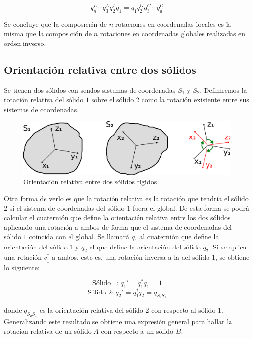 \documentclass[12pt, a4paper]{report}
\begin{document}
\begin{equation}
q_n^L \dotsm q_3^Lq_{2}^Lq_{1} = q_{1}q_{2}^Gq_3^G \dotsm q_n^G
\end{equation}

Se concluye que la composición de $n$ rotaciones en coordenadas locales es la misma que la composición de $n$ rotaciones en coordenadas globales realizadas en orden inverso.

\subsection{Orientación relativa entre dos sólidos}

Se tienen dos sólidos con sendos sistemas de coordenadas $S_1$ y $S_2$. Definiremos la rotación relativa del sólido $1$ sobre el sólido $2$ como la rotación existente entre sus sistemas de coordenadas.\\

\begin{center}
\begin{figure}[h]
\includegraphics[scale=1]{../img/relative_orientation.png} 
\caption{Orientación relativa entre dos sólidos rígidos}
\end{figure}
\end{center}

Otra forma de verlo es que la rotación relativa es la rotación que tendría el sólido $2$ si el sistema de coordenadas del sólido $1$ fuera el global. De esta forma se podrá calcular el cuaternión que define la orientación relativa entre los dos sólidos aplicando una rotación a ambos de forma que el sistema de coordenadas del sólido $1$ coincida con el global. Se llamará $q_1$ al cuaternión que define la orientación del sólido $1$ y $q_2$ al que define la orientación del sólido $q_2$. Si se aplica una rotación $q_1^*$ a ambos, esto es, una rotación inversa a la del sólido $1$, se obtiene lo siguiente:

$$ \text{Sólido 1: } q_1' = q_1^*q_1 = 1 $$
$$ \text{Sólido 2: } q_2' = q_1^*q_2 = q_{S_2S_1} $$

donde $q_{S_2S_1}$ es la orientación relativa del sólido 2 con respecto al sólido 1. Generalizando este resultado se obtiene una expresión general para hallar la rotación relativa de un sólido $A$ con respecto a un sólido $B$:
\end{document}
